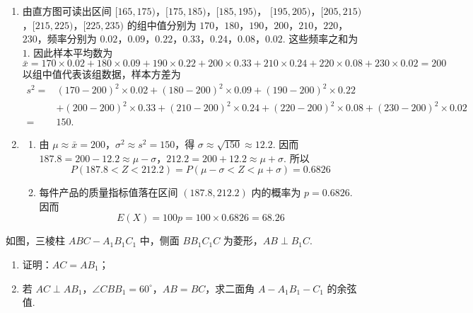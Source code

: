 \begin{solution}
\begin{enumerate}
\item 由直方图可读出区间 \([165,175)\)，\([175,185)\)，\([185,195)\)，
\([195,205)\)，\([205,215)\)，\([215,225)\)，\([225,235)\) 的组中值分别为
\(170\)，\(180\)，\(190\)，\(200\)，\(210\)，\(220\)，\(230\)，频率分别为
\(0.02\)，\(0.09\)，\(0.22\)，\(0.33\)，\(0.24\)，\(0.08\)，\(0.02\). 这些频率之和为 \(1\). 因此样本平均数为
\[
\bar{x}=170\times0.02+180\times0.09+190\times0.22+200\times0.33
 +210\times0.24+220\times0.08+230\times0.02=200
\]
以组中值代表该组数据，样本方差为
\[
\begin{aligned}
s^2={}&(170-200)^2\times0.02+(180-200)^2\times0.09
 +(190-200)^2\times0.22\\
&+(200-200)^2\times0.33+(210-200)^2\times0.24
 +(220-200)^2\times0.08+(230-200)^2\times0.02\\
={}&150.
\end{aligned}
\]

\item
\begin{enumerate}
\item 由 \(\mu\approx\bar{x}=200\)，\(\sigma^2\approx s^2=150\)，得
\(\sigma\approx\sqrt{150}\approx12.2\). 因而
\(187.8=200-12.2\approx\mu-\sigma\)，\(212.2=200+12.2\approx\mu+\sigma\).
所以
\[
P(187.8<Z<212.2)=P(\mu-\sigma<Z<\mu+\sigma)=0.6826
\]
\item 每件产品的质量指标值落在区间 \((187.8,212.2)\) 内的概率为
\(p=0.6826\). 因而
\[
E(X)=100p=100\times0.6826=68.26
\]
\end{enumerate}
\end{enumerate}
\end{solution}

\begin{problem}
如图，三棱柱 \(ABC - A_{1}B_{1}C_{1}\) 中，侧面 \(BB_{1}C_{1}C\) 为菱形，\(AB \perp B_{1}C\).

\begin{enumerate}
\item 证明：\(AC = AB_{1}\)；
\item 若 \(AC \perp AB_{1}\)，\(\angle CBB_{1} = 60^{\circ}\)，\(AB = BC\)，求二面角 \(A - A_{1}B_{1} - C_{1}\) 的余弦值.
\end{enumerate}

\end{problem}

